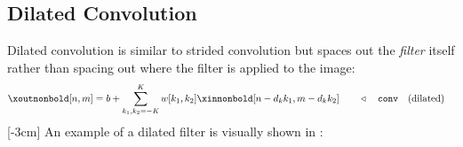 


\subsection{Dilated Convolution}

Dilated convolution is similar to strided convolution but spaces out the \textit{filter} itself rather than spacing out where the filter is applied to the image:
\begin{align}
    \xoutnonbold[n,m] =
    b + \sum_{k_1,k_2=-K}^K w[k_1,k_2] \xinnonbold[n-d_kk_1,m-d_kk_2] & \quad\quad \triangleleft \quad \texttt{conv}\quad \text{(dilated)}\label{eqn:convolutional_neural_nets:convolutional_filter_dilated}
\end{align}
[-3cm]
An example of a dilated filter is visually shown in \fig{\ref{fig:convolutional_neural_networks:dilated_conv_diagram}}:
